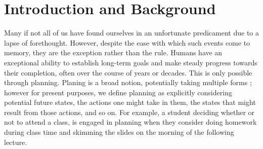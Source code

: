 \documentclass[11pt]{article} %
\begin{document}
\begin{abstract}

\end{abstract}




\startmain %

\section{Introduction and Background}
Many if not all of us have found ourselves in an unfortunate predicament due to a lapse of forethought. However, despite the ease with which such events come to memory, they are the exception rather than the rule. Humans have an exceptional ability to establish long-term goals and make steady progress towards their completion, often over the course of years or decades. This is only possible through planning. Planing is a broad notion, potentially taking multiple forms \cite{Morris2004}; however for present purposes, we define planning as explicitly considering potential future states, the actions one might take in them, the states that might result from those actions, and so on. For example, a student deciding whether or not to attend a class, is engaged in planning when they consider doing homework during class time and skimming the slides on the morning of the following lecture.
\end{document}
